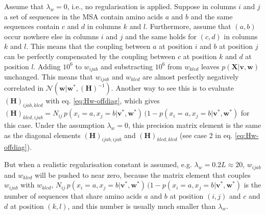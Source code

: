 \documentclass[11pt,a4paper,twoside]{book}
\newcommand{\eq}{\!=\!}
\newcommand{\Gauss}{\mathcal{N}}
\renewcommand{\H}{\mathbf{H}}
\renewcommand{\v}{\mathbf{v}}
\newcommand{\w}{\mathbf{w}}
\newcommand{\X}{\mathbf{X}}
\theoremstyle{definition}
\theoremstyle{definition}
\theoremstyle{remark}
\begin{document}
Assume that \(\lambda_w=0\), i.e., no regularisation is applied. Suppose
in columns \(i\) and \(j\) a set of sequences in the MSA contain amino
acids \(a\) and \(b\) and the same sequences contain \(c\) and \(d\) in
columns \(k\) and \(l\). Furthermore, assume that \((a,b)\) occur
nowhere else in columns \(i\) and \(j\) and the same holds for \((c,d)\)
in columns \(k\) and \(l\). This means that the coupling between \(a\)
at position \(i\) and \(b\) at position \(j\) can be perfectly
compensated by the coupling between \(c\) at position \(k\) and \(d\) at
position \(l\). Adding \(10^6\) to \(w_{ijab}\) and substracting
\(10^6\) from \(w_{klcd}\) leaves \(p(\X|\v,\w)\) unchanged. This means
that \(w_{ijab}\) and \(w_{klcd}\) are almost perfectly negatively
correlated in \(\Gauss(\w|\w^*,(\H)^{-1})\). Another way to see this is
to evaluate \((\H)_{ijab,klcd}\) with eq. \eqref{eq:Hw-offdiag}, which
gives
\((\H)_{klcd, ijab}=N_{ij}\,p(x_i \eq a, x_j \eq b| \v^*,\w^*) \, ( 1 - p(x_i \eq a, x_j \eq b| \v^*,\w^*)\)
for this case. Under the assumption \(\lambda_w=0\), this precision
matrix element is the same as the diagonal elements
\((\H)_{ijab, ijab}\) and \((\H)_{klcd, klcd}\) (see case 2 in eq.
\eqref{eq:Hw-offdiag}).

But when a realistic regularisation constant is assumed, e.g.
\(\lambda_w \eq 0.2 L \approx 20\), \(w_{ijab}\) and \(w_{klcd}\) will
be pushed to near zero, because the matrix element that couples
\(w_{ijab}\) with \(w_{klcd}\),
\(N_{ij}\,p(x_i \eq a, x_j \eq b| \v^*,\w^*) \, ( 1 - p(x_i \eq a, x_j \eq b| \v^*,\w^*)\)
is the number of sequences that share amino acids \(a\) and \(b\) at
position \((i,j)\) and \(c\) and \(d\) at position \((k,l)\), and this
number is usually much smaller than \(\lambda_w\).
\end{document}
